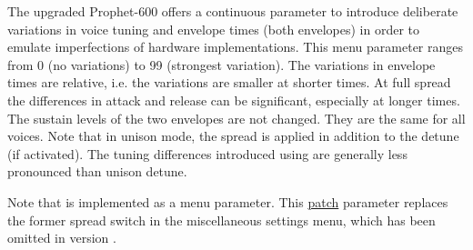 The upgraded Prophet-600 offers a continuous parameter to introduce deliberate variations in voice tuning and envelope times (both envelopes) in  order to emulate imperfections of hardware implementations. This menu parameter \vintage ranges from 0 (no variations) to 99 (strongest variation). The variations in envelope times are relative, i.e. the variations are smaller at shorter times. At full spread the differences in attack and release can be significant, especially at longer times. The sustain levels of the two envelopes are not changed. They are the same for all voices. Note that in unison mode, the spread is applied in addition to the detune (if activated). The tuning differences introduced using \vintage are generally less pronounced than unison detune.

Note that \vintage is implemented as a menu parameter. This \underline{patch} parameter replaces the former spread switch in the miscellaneous settings menu, which has been omitted in version \version.
